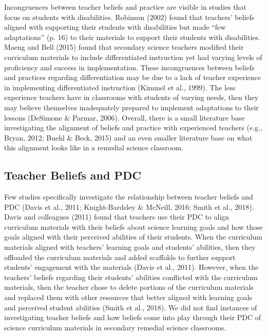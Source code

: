 \documentclass[11.5pt]{sig-alternate}
\begin{document}
\begin{large}
Incongruences between teacher beliefs and practice are visible in studies that focus on students with disabilities. Robinson (2002) found that teachers’ beliefs aligned with supporting their students with disabilities but made “few adaptations” (p. 16) to their materials to support their students with disabilities. Maeng and Bell (2015) found that secondary science teachers modified their curriculum materials to include differentiated instruction yet had varying levels of proficiency and success in implementation. These incongruences between beliefs and practices regarding differentiation may be due to a lack of teacher experience in implementing differentiated instruction (Kimmel et al., 1999). The less experience teachers have in classrooms with students of varying needs, then they may believe themselves inadequately prepared to implement adaptations to their lessons (DeSimone \& Parmar, 2006). Overall, there is a small literature base investigating the alignment of beliefs and practice with experienced teachers (e.g., Bryan, 2012; Buehl \& Beck, 2015) and an even smaller literature base on what this alignment looks like in a remedial science classroom.

\subsection*{Teacher Beliefs and PDC}

Few studies specifically investigate the relationship between teacher beliefs and PDC (Davis et al., 2011; Knight-Bardsley \& McNeill, 2016; Smith et al., 2018). Davis and colleagues (2011) found that teachers use their PDC to align curriculum materials with their beliefs about science learning goals and how those goals aligned with their perceived abilities of their students. When the curriculum materials aligned with teachers’ learning goals and students’ abilities, then they offloaded the curriculum materials and added scaffolds to further support students’ engagement with the materials (Davis et al., 2011). However, when the teachers’ beliefs regarding their students’ abilities conflicted with the curriculum materials, then the teacher chose to delete portions of the curriculum materials and replaced them with other resources that better aligned with learning goals and perceived student abilities (Smith et al., 2018). We did not find instances of investigating teacher beliefs and how beliefs come into play through their PDC of science curriculum materials in secondary remedial science classrooms.


\end{large}
\end{document}
